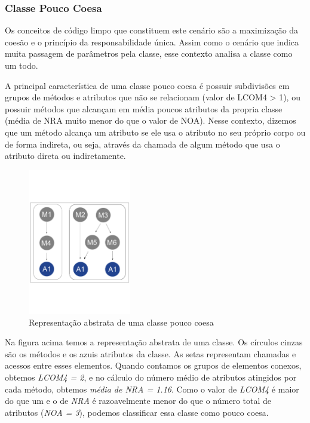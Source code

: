                                       
                      

\subsubsection{Classe Pouco Coesa}
    
Os conceitos de código limpo que constituem este cenário são a maximização da coesão e o princípio da responsabilidade única. Assim como o cenário que indica muita passagem de parâmetros pela classe, esse contexto analisa a classe como um todo.
	
A principal característica de uma classe pouco coesa é possuir subdivisões em grupos de métodos e atributos que não se relacionam (valor de LCOM4 > 1), ou possuir métodos que alcançam em média poucos atributos da propria classe (média de NRA muito menor do que o valor de NOA). Nesse contexto, dizemos que um método alcança um atributo se ele usa o atributo no seu próprio corpo ou de forma indireta, ou seja, através da chamada de algum método que usa o atributo direta ou indiretamente.


\vskip 1.0cm		
\begin{figure}[htb]
	\centering
	\includegraphics[trim = 0mm 50mm 0mm 60mm, clip, width=0.4\textwidth]{codigos/exemplos_para_os_cenarios/classe_pouco_coesa.png}
	\caption{Representação abstrata de uma classe pouco coesa}
	\label{classe_pouco_coesa}
\end{figure}
   
    
Na figura acima temos a representação abstrata de uma classe. Os círculos cinzas são os métodos e os azuis atributos da classe. As setas representam chamadas e acessos entre esses elementos. Quando contamos os grupos de elementos conexos, obtemos \textit{LCOM4 = 2}, e no cálculo do número médio de atributos atingidos por cada método, obtemos \textit{média de NRA = 1.16}. Como o valor de \textit{LCOM4} é maior do que um e o de \textit{NRA} é razoavelmente menor do que o número total de atributos (\textit{NOA = 3}), podemos classificar essa classe como pouco coesa.                  
    

